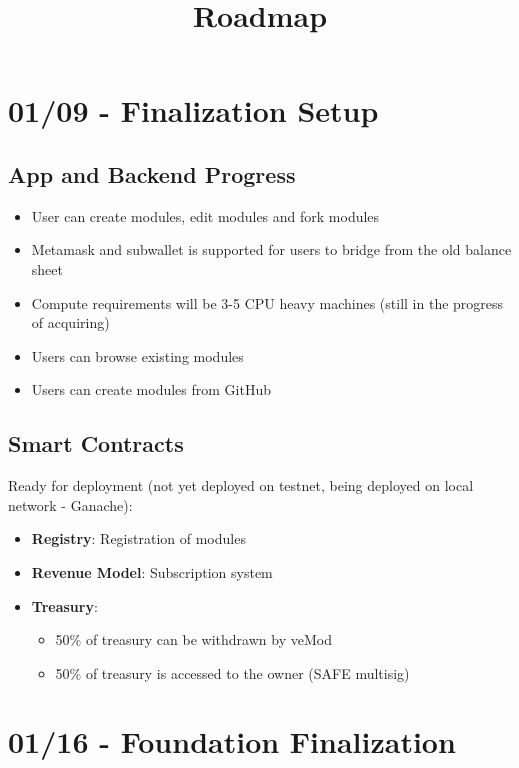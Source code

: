 \documentclass{article}
\title{\Huge\bfseries Roadmap}
\author{}
\date{}
\begin{document}
\maketitle

\section{01/09 - Finalization Setup}

\subsection{App and Backend Progress}
\begin{itemize}[leftmargin=*]
    \item User can create modules, edit modules and fork modules
    \item Metamask and subwallet is supported for users to bridge from the old balance sheet
    \item Compute requirements will be 3-5 CPU heavy machines (still in the progress of acquiring)
    \item Users can browse existing modules
    \item Users can create modules from GitHub
\end{itemize}

\subsection{Smart Contracts}
Ready for deployment (not yet deployed on testnet, being deployed on local network - Ganache):
\begin{itemize}[leftmargin=*]
    \item \textbf{Registry}: Registration of modules
    \item \textbf{Revenue Model}: Subscription system
    \item \textbf{Treasury}:
    \begin{itemize}
        \item 50\% of treasury can be withdrawn by veMod
        \item 50\% of treasury is accessed to the owner (SAFE multisig)
    \end{itemize}
\end{itemize}

\section{01/16 - Foundation Finalization}
\end{document}
